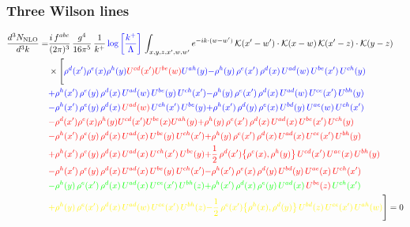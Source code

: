 \documentclass[9pt]{article}
\numberwithin{equation}{section}
\begin{document}
\subsubsection{Three Wilson lines}
\begin{align}
    \frac{d^{3}N_{\rm NLO}}{d^{3}k}= & \frac{i\,f^{abc}}{(2\pi)^{3}}\,\frac{g^{4}}{16\pi^{5}}\,\frac{1}{k^{+}}\,{\color{blue}\log{\left[\frac{k^{+}}{\Lambda}\right]}}\,\int_{x,y,z,x',w,w'}e^{-ik\cdot (w-w')}\,\mathcal{K}(x'-w')\cdot\mathcal{K}(x-w)\,\mathcal{K}(x'-z)\cdot\mathcal{K}(y-z)\notag \\ & \times\Bigg[{\color{blue}\rho^{d}(x') \rho^{e}(x) \rho^{h}(y) {\color{red}U^{cd}(x')} {\color{red}U^{be}(w)} U^{a h}(y)}{\color{blue}-\rho^{h}(y)\,\rho^{e}(x')\,\rho^{d}(x)\,U^{ad}(w)\,U^{be}(x')\,U^{ch}(y)}\notag \\
&{\color{blue}+\rho^{h}(x')\,\rho^{e}(y)\,\rho^{d}(x)\,U^{ad}(w)\,U^{be}(y)\,U^{ch}(x')}{\color{blue}-\rho^{h}(y)\,\rho^{e}(x')\,\rho^{d}(x)\,U^{ad}(w)\,U^{ce}(x')\,U^{bh}(y)} \notag \\ &{\color{blue}-\rho^{h}(x')\,\rho^{e}(y)\,\rho^{d}(x)\,{\color{red}U^{ad}(w)}\,U^{ch}(x')\,U^{be}(y)}{\color{blue}+\rho^{h}(x')\,\rho^{d}(y)\,\rho^{e}(x)\,U^{bd}(y)\,U^{ae}(w)\,U^{ch}(x')}\notag \\
&{\color{red}-\rho^{d}(x') \rho^{e}(x) \rho^{h}(y) {\color{red}U^{cd}(x')} U^{b e}(x) U^{a h}(y)}{\color{red}+\rho^{h}(y)\,\rho^{e}(x')\,\rho^{d}(x)\,U^{ad}(x)\,U^{be}(x')\,U^{ch}(y)}\notag \\ & {\color{red}-\rho^{h}(x')\,\rho^{e}(y)\,\rho^{d}(x)\,U^{ad}(x)\,U^{be}(y)\,U^{ch}(x')} {\color{red}+\rho^{h}(y)\,\rho^{e}(x')\,\rho^{d}(x)\,U^{ad}(x)\,U^{ce}(x')\,U^{bh}(y)}\notag \\ & {\color{red}+\rho^{h}(x')\,\rho^{e}(y)\,\rho^{d}(x)\,{\color{red}U^{ad}(x)}\,U^{ch}(x')\,U^{be}(y)}{\color{red}+\frac{1}{2}\,\rho^{d}(x')\big\{\rho^{e}(x),\rho^{h}(y)\big\}\,U^{cd}(x')\,U^{ae}(x)\,U^{bh}(y)}\notag \\ & {\color{red}-\rho^{h}(x')\,\rho^{e}(y)\,\rho^{d}(x)\,U^{ad}(x)\,U^{be}(y)\,U^{ch}(x')}{\color{red}-\rho^{h}(x')\,\rho^{e}(x)\,\rho^{d}(y)\,U^{bd}(y)\,U^{ae}(x)\,U^{ch}(x')}\notag \\ & {\color{green}-\rho^{h}(y)\,\rho^{e}(x')\,\rho^{d}(x)\,U^{ad}(x)\,U^{ce}(x')\,U^{bh}(z)}{\color{green}+\rho^{h}(x')\,\rho^{d}(x)\,\rho^{e}(y)\,U^{ad}(x)\,{\color{red}U^{be}(z)}\,U^{ch}(x')}\notag \\ & {\color{yellow}+\rho^{h}(y)\,\rho^{e}(x')\,\rho^{d}(x)\,U^{ad}(w)\,U^{ce}(x')\,U^{bh}(z)}{\color{yellow}-\frac{1}{2}\,\rho^{e}(x')\big\{\rho^{h}(x),\rho^{d}(y)\big\}\,U^{bd}(z)\,U^{ce}(x')\,U^{ah}(w)}\Bigg] = 0
\end{align}
\end{document}

